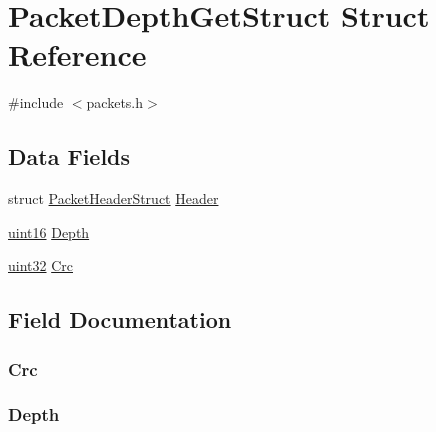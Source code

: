 \hypertarget{struct_packet_depth_get_struct}{}\section{Packet\+Depth\+Get\+Struct Struct Reference}
\label{struct_packet_depth_get_struct}


{\ttfamily \#include $<$packets.\+h$>$}

\subsection*{Data Fields}
\begin{DoxyCompactItemize}
\item 
struct \hyperlink{struct_packet_header_struct}{Packet\+Header\+Struct} \hyperlink{struct_packet_depth_get_struct_ab201af50281aff5ed4f984f994938007}{Header}
\item 
\hyperlink{_h_y_d_r_a_s_8_x_2types_8h_ac2a9e79eb120216f855626495b7bd18a}{uint16} \hyperlink{struct_packet_depth_get_struct_afeab9f51fb885ecd24211f3bb28b0fb6}{Depth}
\item 
\hyperlink{_h_y_d_r_a_s_8_x_2types_8h_acbd4acd0d29e2d6c43104827f77d9cd2}{uint32} \hyperlink{struct_packet_depth_get_struct_a1aaa4998291cff4c19ca5cca4b1e9489}{Crc}
\end{DoxyCompactItemize}


\subsection{Field Documentation}
\hypertarget{struct_packet_depth_get_struct_a1aaa4998291cff4c19ca5cca4b1e9489}{}
\subsubsection[{Crc}]{ Crc}\label{struct_packet_depth_get_struct_a1aaa4998291cff4c19ca5cca4b1e9489}
\hypertarget{struct_packet_depth_get_struct_afeab9f51fb885ecd24211f3bb28b0fb6}{}
\subsubsection[{Depth}]{ Depth}\label{struct_packet_depth_get_struct_afeab9f51fb885ecd24211f3bb28b0fb6}
\hypertarget{struct_packet_depth_get_struct_ab201af50281aff5ed4f984f994938007}{}

